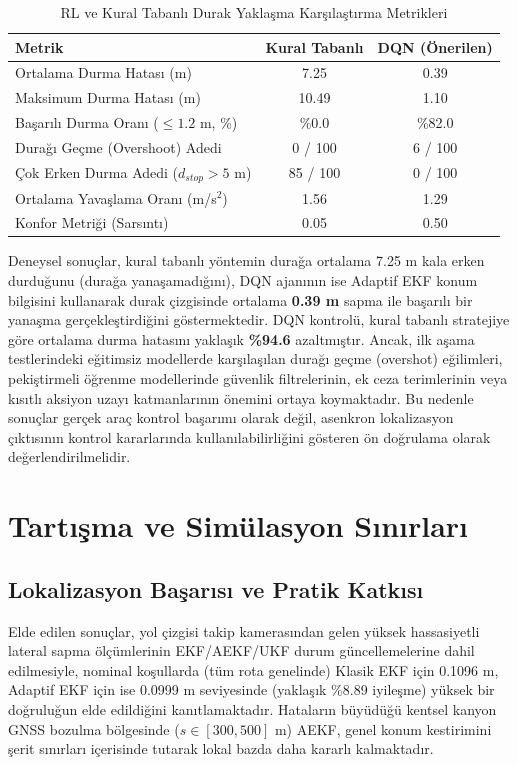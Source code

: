 ﻿\documentclass[conference]{IEEEtran}
\begin{document}
\begin{table}[htbp]
\caption{RL ve Kural Tabanlı Durak Yaklaşma Karşılaştırma Metrikleri}
\label{tab:rl_results}
\centering
\footnotesize
\begin{tabular}{lcc}
\toprule
\textbf{Metrik} & \textbf{Kural Tabanlı} & \textbf{DQN (Önerilen)} \\
\midrule
Ortalama Durma Hatası (m) & 7.25 & 0.39 \\
Maksimum Durma Hatası (m) & 10.49 & 1.10 \\
Başarılı Durma Oranı ($\le 1.2$ m, \%) & \%0.0 & \%82.0 \\
Durağı Geçme (Overshoot) Adedi & 0 / 100 & 6 / 100 \\
Çok Erken Durma Adedi ($d_{stop} > 5$ m) & 85 / 100 & 0 / 100 \\
Ortalama Yavaşlama Oranı (m/s$^2$) & 1.56 & 1.29 \\
Konfor Metriği (Sarsıntı) & 0.05 & 0.50 \\
\bottomrule
\end{tabular}
\end{table}

Deneysel sonuçlar, kural tabanlı yöntemin durağa ortalama 7.25 m kala erken durduğunu (durağa yanaşamadığını), DQN ajanının ise Adaptif EKF konum bilgisini kullanarak durak çizgisinde ortalama \textbf{0.39 m} sapma ile başarılı bir yanaşma gerçekleştirdiğini göstermektedir. DQN kontrolü, kural tabanlı stratejiye göre ortalama durma hatasını yaklaşık \textbf{\%94.6} azaltmıştır. Ancak, ilk aşama testlerindeki eğitimsiz modellerde karşılaşılan durağı geçme (overshot) eğilimleri, pekiştirmeli öğrenme modellerinde güvenlik filtrelerinin, ek ceza terimlerinin veya kısıtlı aksiyon uzayı katmanlarının önemini ortaya koymaktadır. Bu nedenle sonuçlar gerçek araç kontrol başarımı olarak değil, asenkron lokalizasyon çıktısının kontrol kararlarında kullanılabilirliğini gösteren ön doğrulama olarak değerlendirilmelidir.

\section{Tartışma ve Simülasyon Sınırları}
\subsection{Lokalizasyon Başarısı ve Pratik Katkısı}
Elde edilen sonuçlar, yol çizgisi takip kamerasından gelen yüksek hassasiyetli lateral sapma ölçümlerinin EKF/AEKF/UKF durum güncellemelerine dahil edilmesiyle, nominal koşullarda (tüm rota genelinde) Klasik EKF için 0.1096 m, Adaptif EKF için ise 0.0999 m seviyesinde (yaklaşık \%8.89 iyileşme) yüksek bir doğruluğun elde edildiğini kanıtlamaktadır. Hataların büyüdüğü kentsel kanyon GNSS bozulma bölgesinde ($s \in [300, 500]$ m) AEKF, genel konum kestirimini şerit sınırları içerisinde tutarak lokal bazda daha kararlı kalmaktadır.
\end{document}
